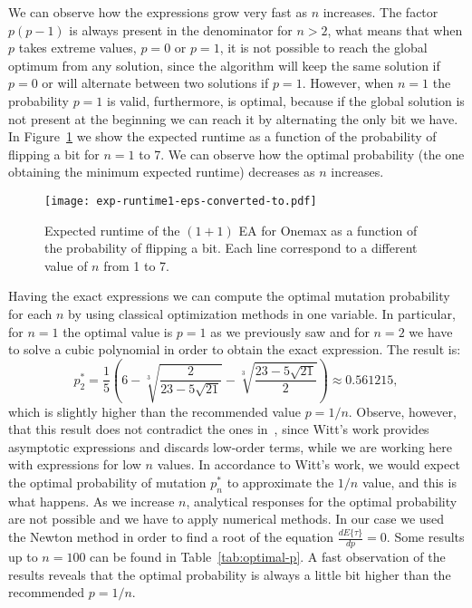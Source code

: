 \documentclass{article}
\newcommand{\Exp}[1]{E\{#1\}}
\begin{document}
We can observe how the expressions grow very fast as $n$ increases. The factor $p(p-1)$ is always present in the denominator for $n>2$, what means that when $p$ takes extreme values, $p=0$ or $p=1$, it is not possible to reach the global optimum from any solution, since the algorithm will keep the same solution if $p=0$ or will alternate between two solutions if $p=1$. However, when $n=1$ the probability $p=1$ is valid, furthermore, is optimal, because if the global solution is not present at the beginning we can reach it by alternating the only bit we have. In Figure~\ref{fig:onemax} we show the expected runtime as a function of the probability of flipping a bit for $n=1$ to 7. We can observe how the optimal probability (the one obtaining the minimum expected runtime) decreases as $n$ increases.

\begin{figure}[!ht]
\centering
\texttt{[image: exp-runtime1-eps-converted-to.pdf]}
\caption{Expected runtime of the $(1+1)$ EA for Onemax as a function of the probability of flipping a bit. Each line correspond to a different value of $n$ from 1 to 7.}
\label{fig:onemax}
\end{figure}

Having the exact expressions we can compute the optimal mutation probability for each $n$ by using classical optimization methods in one variable. In particular, for $n=1$ the optimal value is $p=1$ as we previously saw and for $n=2$ we have to solve a cubic polynomial in order to obtain the exact expression. The result is:
\begin{equation}
p_2^* = \frac{1}{5} \left(6-
\sqrt[3]{\frac{2}{23-5 \sqrt{21}}}
-\sqrt[3]{\frac{23-5 \sqrt{21}}{2}}
\right) \approx 0.561215 ,
\end{equation}
which is slightly higher than the recommended value $p=1/n$. Observe, however, that this result does not contradict the ones in~\cite{Witt2013tight}, since Witt's work provides asymptotic expressions and discards low-order terms, while we are working here with expressions for low $n$ values. In accordance to Witt's work, we would expect the optimal probability of mutation $p_n^*$ to approximate the $1/n$ value, and this is what happens.
As we increase $n$, analytical responses for the optimal probability are not possible and we have to apply numerical methods. In our case we used the Newton method in order to find a root of the equation $\frac{d \Exp{\tau}}{d p}=0$. Some results up to $n=100$ can be found in Table~\ref{tab:optimal-p}. A fast observation of the results reveals that the optimal probability is always a little bit higher than the recommended $p=1/n$.
\end{document}
